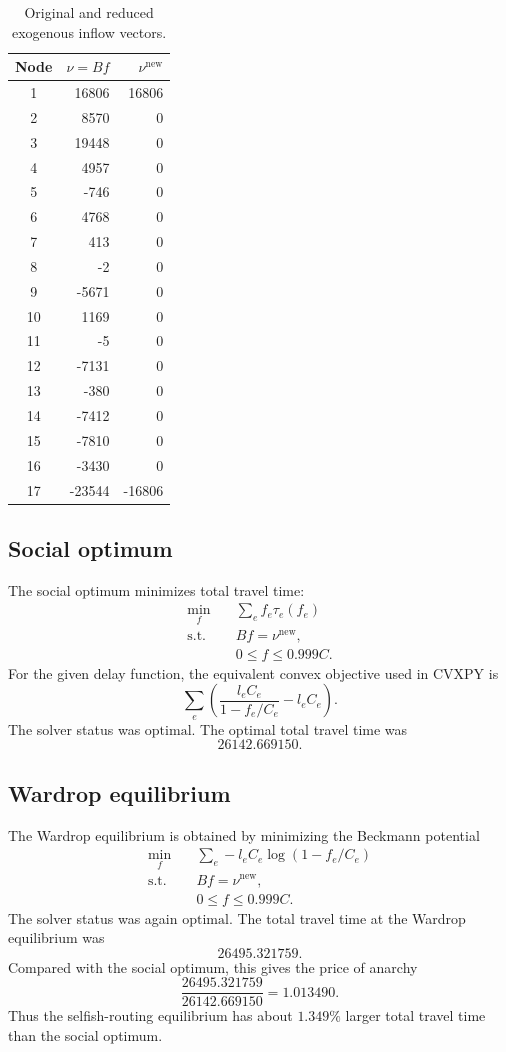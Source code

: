\documentclass[11pt,a4paper]{article}
\begin{document}
\begin{table}[h]
\centering
\begin{tabular}{c|r|r}
\hline
Node & \(\nu=Bf\) & \(\nu^{\mathrm{new}}\)\\
\hline
1 & 16806 & 16806\\
2 & 8570 & 0\\
3 & 19448 & 0\\
4 & 4957 & 0\\
5 & -746 & 0\\
6 & 4768 & 0\\
7 & 413 & 0\\
8 & -2 & 0\\
9 & -5671 & 0\\
10 & 1169 & 0\\
11 & -5 & 0\\
12 & -7131 & 0\\
13 & -380 & 0\\
14 & -7412 & 0\\
15 & -7810 & 0\\
16 & -3430 & 0\\
17 & -23544 & -16806\\
\hline
\end{tabular}
\caption{Original and reduced exogenous inflow vectors.}
\label{tab:exercise3-nu}
\end{table}

\subsection*{Social optimum}

The social optimum minimizes total travel time:
\[
\begin{aligned}
\min_f \quad & \sum_e f_e \tau_e(f_e)\\
\text{s.t.}\quad & Bf=\nu^{\mathrm{new}},\\
&0\leq f\leq 0.999C .
\end{aligned}
\]
For the given delay function, the equivalent convex objective used in CVXPY is
\[
\sum_e \left(\frac{l_e C_e}{1-f_e/C_e}-l_e C_e\right).
\]
The solver status was \(\mathrm{optimal}\). The optimal total travel time was
\[
26142.669150.
\]

\subsection*{Wardrop equilibrium}

The Wardrop equilibrium is obtained by minimizing the Beckmann potential
\[
\begin{aligned}
\min_f \quad & \sum_e -l_e C_e\log(1-f_e/C_e)\\
\text{s.t.}\quad & Bf=\nu^{\mathrm{new}},\\
&0\leq f\leq 0.999C .
\end{aligned}
\]
The solver status was again \(\mathrm{optimal}\). The total travel time at the
Wardrop equilibrium was
\[
26495.321759.
\]
Compared with the social optimum, this gives the price of anarchy
\[
\frac{26495.321759}{26142.669150}=1.013490.
\]
Thus the selfish-routing equilibrium has about \(1.349\%\) larger total travel
time than the social optimum.
\end{document}
